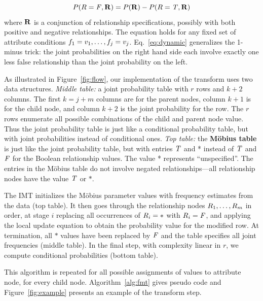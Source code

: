 \documentclass[oribibl]{llncs}
\begin{document}
\begin{equation}
P(R = \mathit{F}, \mathbf{R}) =
P(\mathbf{R}) - P(R = \mathit{T}, \mathbf{R})
\label{eq:dynamic}
\end{equation}
where $\mathbf{R}$ is a conjunction of relationship specifications, possibly with both positive and negative relationships. The equation holds for any fixed set of attribute conditions $f_{1} = v_{1},\ldots,f_{j} = v_{j}$. Eq.~\ref{eq:dynamic} generalizes the 1-minus trick: the joint probabilities on the right hand side each involve exactly one less false relationship than the joint probability on the left. 

As illustrated in Figure~\ref{fig:flow}, our implementation of the transform uses two data structures. {\em Middle table:} a joint probability table with $r$ rows and $k+2$ columns. The first $k = j + m$ columns are for the parent nodes, column $k+1$ is for the child node, and column $k+2$ is the joint probability for the row. The $r$ rows enumerate all possible combinations of the child and parent node value. Thus the joint probability table is just like a conditional probability table, but with joint probabilities instead of conditional ones. {\em Top table:} the \textbf{M\"obius table} is just like the joint probability table, but with entries $\mathit{T}$ and * instead of $\mathit{T}$ and $\mathit{F}$ for the Boolean relationship values. The value * represents ``unspecified''. The entries in the M\"obius table do not involve negated relationships---all relationship nodes have the value $\mathit{T}$ or $*$.

The IMT initializes the M\"obius parameter values with frequency estimates from the data (top table).   It then goes through the relationship nodes $R_{1},\ldots,R_{m}$ in order, at stage $i$ replacing all occurrences of $R_{i} = *$ with $R_{i} = \mathit{F}$, and applying the local update equation to obtain the probability value for the modified row.
At termination, all $*$ values have been replaced by $\mathit{F}$ and the table specifies all joint frequencies (middle table). In the final step, with complexity linear in $r$, we compute conditional probabilities (bottom table).

This algorithm is repeated for all possible assignments of values to attribute node, for every child node. Algorithm~\ref{alg:fmt} gives pseudo code and Figure~\ref{fig:example} presents an example of the transform step.
\end{document}
